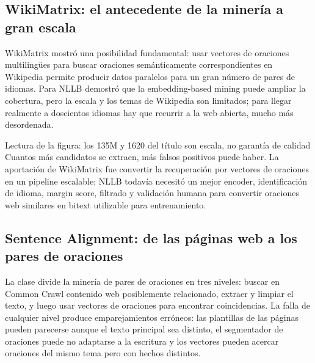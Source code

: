 \subsection{WikiMatrix: el antecedente de la minería a gran escala}

WikiMatrix mostró una posibilidad fundamental: usar vectores de oraciones multilingües para buscar oraciones semánticamente correspondientes en Wikipedia permite producir datos paralelos para un gran número de pares de idiomas. Para NLLB demostró que la embedding-based mining puede ampliar la cobertura, pero la escala y los temas de Wikipedia son limitados; para llegar realmente a doscientos idiomas hay que recurrir a la web abierta, mucho más desordenada.


\begin{knowledgebox}{Lectura de la figura: los 135M y 1620 del título son escala, no garantía de calidad}
Cuantos más candidatos se extraen, más falsos positivos puede haber. La aportación de WikiMatrix fue convertir la recuperación por vectores de oraciones en un pipeline escalable; NLLB todavía necesitó un mejor encoder, identificación de idioma, margin score, filtrado y validación humana para convertir oraciones web similares en bitext utilizable para entrenamiento.
\end{knowledgebox}

\subsection{Sentence Alignment: de las páginas web a los pares de oraciones}

La clase divide la minería de pares de oraciones en tres niveles: buscar en Common Crawl contenido web posiblemente relacionado, extraer y limpiar el texto, y luego usar vectores de oraciones para encontrar coincidencias. La falla de cualquier nivel produce emparejamientos erróneos: las plantillas de las páginas pueden parecerse aunque el texto principal sea distinto, el segmentador de oraciones puede no adaptarse a la escritura y los vectores pueden acercar oraciones del mismo tema pero con hechos distintos.


